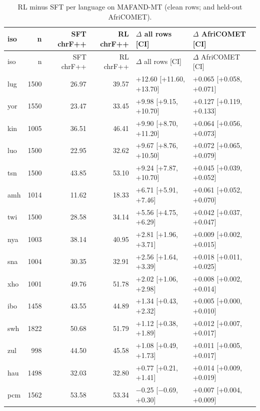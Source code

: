 {\scriptsize
\setlength{\tabcolsep}{4pt}
\begin{longtable}{@{}lrrrll@{}}
\caption{RL minus SFT per language on MAFAND-MT (clean rows; \chrfpp{} and held-out AfriCOMET).}\label{tab:perlang_mafand}\\
\toprule
iso & n & SFT chrF++ & RL chrF++ & $\Delta$ all rows [CI] & $\Delta$ AfriCOMET [CI] \\
\midrule\endfirsthead
\toprule
iso & n & SFT chrF++ & RL chrF++ & $\Delta$ all rows [CI] & $\Delta$ AfriCOMET [CI] \\
\midrule\endhead
\bottomrule\endlastfoot
lug & 1500 & 26.97 & 39.57 & +12.60 [+11.60, +13.70] & +0.065 [+0.058, +0.071] \\
yor & 1550 & 23.47 & 33.45 & +9.98 [+9.15, +10.70] & +0.127 [+0.119, +0.133] \\
kin & 1005 & 36.51 & 46.41 & +9.90 [+8.70, +11.20] & +0.064 [+0.056, +0.073] \\
luo & 1500 & 22.95 & 32.62 & +9.67 [+8.76, +10.50] & +0.072 [+0.065, +0.079] \\
tsn & 1500 & 43.85 & 53.10 & +9.24 [+7.87, +10.70] & +0.045 [+0.039, +0.052] \\
amh & 1014 & 11.62 & 18.33 & +6.71 [+5.91, +7.46] & +0.061 [+0.052, +0.070] \\
twi & 1500 & 28.58 & 34.14 & +5.56 [+4.75, +6.29] & +0.042 [+0.037, +0.047] \\
nya & 1003 & 38.14 & 40.95 & +2.81 [+1.96, +3.71] & +0.009 [+0.002, +0.015] \\
sna & 1004 & 30.35 & 32.91 & +2.56 [+1.64, +3.39] & +0.018 [+0.011, +0.025] \\
xho & 1001 & 49.76 & 51.78 & +2.02 [+1.06, +2.98] & +0.008 [+0.002, +0.014] \\
ibo & 1458 & 43.55 & 44.89 & +1.34 [+0.43, +2.32] & +0.005 [+0.000, +0.010] \\
swh & 1822 & 50.68 & 51.79 & +1.12 [+0.38, +1.89] & +0.012 [+0.007, +0.017] \\
zul & 998 & 44.50 & 45.58 & +1.08 [+0.49, +1.73] & +0.011 [+0.005, +0.017] \\
hau & 1498 & 32.03 & 32.80 & +0.77 [+0.21, +1.41] & +0.014 [+0.009, +0.019] \\
pcm & 1562 & 53.58 & 53.34 & \ensuremath{-}0.25 [\ensuremath{-}0.69, +0.30] & +0.007 [+0.004, +0.009] \\
\end{longtable}
}

